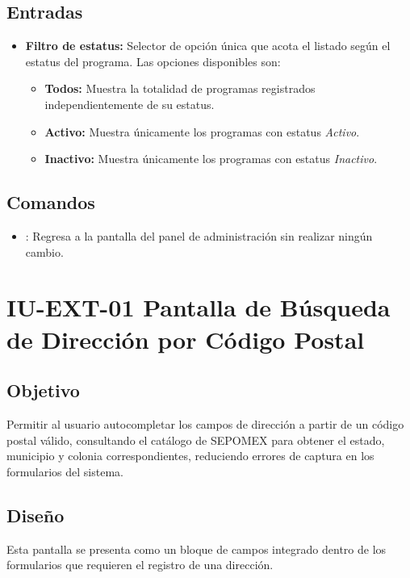 \subsection{Entradas}
\begin{itemize}
	\item \textbf{Filtro de estatus:} Selector de opción única que acota el 
	listado según el estatus del programa. Las opciones disponibles son:
	\begin{itemize}
		\item \textbf{Todos:} Muestra la totalidad de programas registrados 
		independientemente de su estatus.
		\item \textbf{Activo:} Muestra únicamente los programas con estatus 
		\textit{Activo}.
		\item \textbf{Inactivo:} Muestra únicamente los programas con estatus 
		\textit{Inactivo}.
	\end{itemize}
\end{itemize}

\subsection{Comandos}
\begin{itemize}
	\item {}: Regresa a la pantalla del panel de 
	administración sin realizar ningún cambio.
\end{itemize}


\section{IU-EXT-01 Pantalla de Búsqueda de Dirección por Código Postal}
\subsection{Objetivo}
Permitir al usuario autocompletar los campos de dirección a partir de un código 
postal válido, consultando el catálogo de SEPOMEX para obtener el estado, 
municipio y colonia correspondientes, reduciendo errores de captura en los 
formularios del sistema.

\subsection{Diseño}
Esta pantalla  se presenta como un bloque de campos integrado dentro de los formularios 
que requieren el registro de una dirección.

